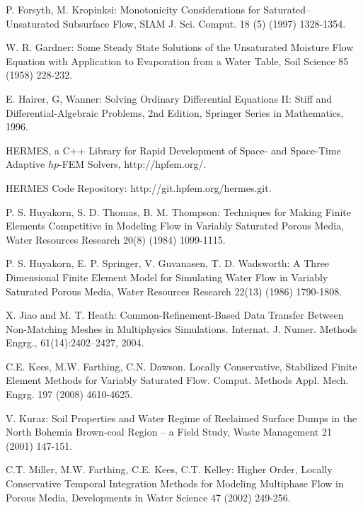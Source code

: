 \documentclass[final,3p,times,twocolumn]{elsarticle}
\begin{document}
\begin{thebibliography}{00}
P. Forsyth, M. Kropinksi: Monotonicity Considerations for Saturated–
Unsaturated Subsurface Flow, SIAM J. Sci. Comput. 18 (5) (1997) 1328-1354.

     W. R. Gardner: Some Steady State Solutions of the Unsaturated Moisture Flow Equation with Application to Evaporation from a Water Table, Soil Science 85 (1958) 228-232.

E. Hairer, G, Wanner:
Solving Ordinary Differential Equations II: Stiff and Differential-Algebraic Problems,
2nd Edition, Springer Series in Mathematics, 1996.

HERMES, a C++ Library for Rapid Development of Space- and Space-Time Adaptive $hp$-FEM Solvers,
http://hpfem.org/.

HERMES Code Repository: http://git.hpfem.org/hermes.git.

     P. S. Huyakorn, S. D. Thomas, B. M. Thompson: Techniques for Making Finite Elements Competitive in Modeling Flow in Variably Saturated Porous Media, Water Resources Research 20(8) (1984) 1099-1115.

     P. S. Huyakorn, E. P. Springer, V. Guvanasen, T. D. Wadsworth: A Three Dimensional Finite Element Model for Simulating Water Flow in Variably Saturated Porous Media, Water Resources Research 22(13) (1986) 1790-1808.

 X. Jiao and M. T. Heath: Common-Refinement-Based Data Transfer Between Non-Matching Meshes in
Multiphysics Simulations. Internat. J. Numer. Methods Engrg., 61(14):2402–2427, 2004.

    C.E. Kees, M.W. Farthing, C.N. Dawson.
    Locally Conservative, Stabilized Finite Element Methods for Variably Saturated Flow.
    Comput. Methods Appl. Mech. Engrg. 197 (2008) 4610-4625.

     V. Kuraz:
    Soil Properties and Water Regime of Reclaimed Surface Dumps in the
    North Bohemia Brown-coal Region -- a Field Study,
    Waste Management 21 (2001) 147-151.




C.T. Miller, M.W. Farthing, C.E. Kees, C.T. Kelley:
Higher Order, Locally Conservative Temporal Integration Methods for Modeling Multiphase Flow in Porous Media, Developments in Water Science 47 (2002) 249-256.


\end{thebibliography}
\end{document}
